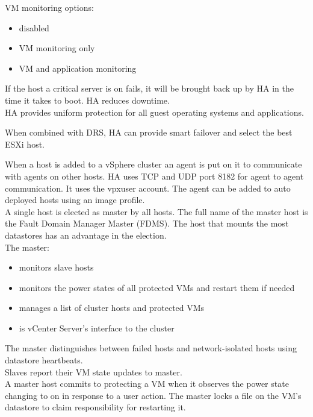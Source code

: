 VM monitoring options:

\begin{itemize}
\item disabled
\item VM monitoring only
\item VM and application monitoring
\end{itemize}

If the host a critical server is on fails, it will be brought back up by HA
in the time it takes to boot. HA reduces downtime.\\

HA provides uniform protection for all guest operating systems and
applications.

When combined with DRS, HA can provide smart failover and select the best
ESXi host.

When a host is added to a vSphere cluster an agent is put on it to
communicate with agents on other hosts. HA uses TCP and UDP port 8182 for
agent to agent communication. It uses the vpxuser account. The agent can
be added to auto deployed hosts using an image profile.\\

A single host is elected as master by all hosts. The full name of the master
host is the Fault Domain Manager Master (FDMS). The host that mounts the most
datastores has an advantage in the election.\\

The master:

\begin{itemize}
\item monitors slave hosts
\item monitors the power states of all protected VMs and restart them if needed
\item manages a list of cluster hosts and protected VMs
\item is vCenter Server's interface to the cluster
\end{itemize}

The master distinguishes between failed hosts and network-isolated hosts using
datastore heartbeats.\\

Slaves report their VM state updates to master.\\

A master host commits to protecting a VM when it observes the power state
changing to on in response to a user action. The master locks a file on the
VM's datastore to claim responsibility for restarting it.\\

